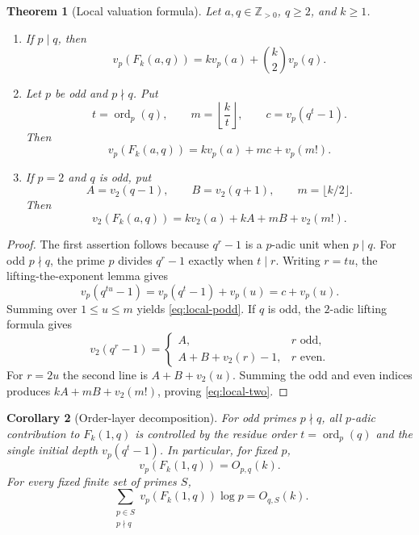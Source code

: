 \documentclass[11pt]{article}
\newtheorem{theorem}{Theorem}[section]
\newtheorem{corollary}[theorem]{Corollary}
\theoremstyle{definition}
\theoremstyle{remark}
\newcommand{\Z}{\mathbb Z}
\newcommand{\ord}{\operatorname{ord}}
\begin{document}
\begin{theorem}[Local valuation formula]\label{thm:local-profile}
Let $a,q\in\Z_{>0}$, $q\geq2$, and $k\geq1$.
\begin{enumerate}
 \item If $p\mid q$, then
 \begin{equation}\label{eq:local-pdivq}
   v_p(F_k(a,q))=k v_p(a)+\binom{k}{2}v_p(q).
 \end{equation}
 \item Let $p$ be odd and $p\nmid q$.  Put
 \[
   t=\ord_p(q),\qquad m=\left\lfloor\frac{k}{t}\right\rfloor,
   \qquad c=v_p(q^t-1).
 \]
 Then
 \begin{equation}\label{eq:local-podd}
   v_p(F_k(a,q))=k v_p(a)+mc+v_p(m!).
 \end{equation}
 \item If $p=2$ and $q$ is odd, put
 \[
   A=v_2(q-1),\qquad B=v_2(q+1),\qquad m=\lfloor k/2\rfloor.
 \]
 Then
 \begin{equation}\label{eq:local-two}
   v_2(F_k(a,q))=k v_2(a)+kA+mB+v_2(m!).
 \end{equation}
\end{enumerate}
\end{theorem}

\begin{proof}
The first assertion follows because $q^r-1$ is a $p$-adic unit when $p\mid q$.
For odd $p\nmid q$, the prime $p$ divides $q^r-1$ exactly when $t\mid r$.
Writing $r=tu$, the lifting-the-exponent lemma gives
\[
 v_p(q^{tu}-1)=v_p(q^t-1)+v_p(u)=c+v_p(u).
\]
Summing over $1\leq u\leq m$ yields \eqref{eq:local-podd}.  If $q$ is odd,
the $2$-adic lifting formula gives
\[
 v_2(q^r-1)=
 \begin{cases}
  A,&r\text{ odd},\\
  A+B+v_2(r)-1,&r\text{ even}.
 \end{cases}
\]
For $r=2u$ the second line is $A+B+v_2(u)$.  Summing the odd and even indices
produces $kA+mB+v_2(m!)$, proving \eqref{eq:local-two}.
\end{proof}

\begin{corollary}[Order-layer decomposition]\label{cor:order-layer}
For odd primes $p\nmid q$, all $p$-adic contribution to $F_k(1,q)$ is
controlled by the residue order $t=\ord_p(q)$ and the single initial depth
$v_p(q^t-1)$.  In particular, for fixed $p$,
\[
 v_p(F_k(1,q))=O_{p,q}(k).
\]
For every fixed finite set of primes $S$,
\begin{equation}\label{eq:fixed-cyc-linear}
 \sum_{\substack{p\in S\\p\nmid q}}v_p(F_k(1,q))\log p=O_{q,S}(k).
\end{equation}
\end{corollary}
\end{document}

